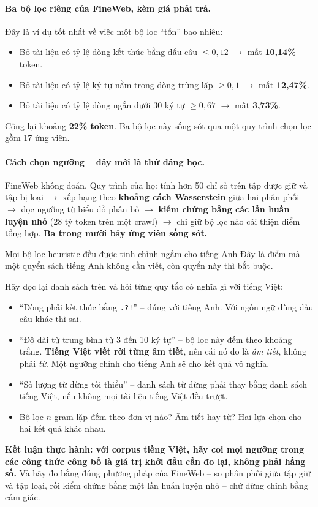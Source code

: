 \paragraph{Ba bộ lọc riêng của FineWeb, kèm giá phải trả.} Đây là ví dụ tốt nhất về việc một bộ lọc “tốn” bao nhiêu:
\begin{itemize}
	\item Bỏ tài liệu có tỷ lệ dòng kết thúc bằng dấu câu $\le 0{,}12$ $\rightarrow$ mất \textbf{10{,}14\%} token.
	\item Bỏ tài liệu có tỷ lệ ký tự nằm trong dòng trùng lặp $\ge 0{,}1$ $\rightarrow$ mất \textbf{12{,}47\%}.
	\item Bỏ tài liệu có tỷ lệ dòng ngắn dưới 30 ký tự $\ge 0{,}67$ $\rightarrow$ mất \textbf{3{,}73\%}.
\end{itemize}
Cộng lại khoảng \textbf{22\% token}. Ba bộ lọc này sống sót qua một quy trình chọn lọc gồm 17 ứng viên.

\paragraph{Cách chọn ngưỡng -- đây mới là thứ đáng học.} FineWeb không đoán. Quy trình của họ: tính hơn 50 chỉ số trên tập được giữ và tập bị loại $\rightarrow$ xếp hạng theo \textbf{khoảng cách Wasserstein} giữa hai phân phối $\rightarrow$ đọc ngưỡng từ biểu đồ phân bố $\rightarrow$ \textbf{kiểm chứng bằng các lần huấn luyện nhỏ} (28 tỷ token trên một crawl) $\rightarrow$ chỉ giữ bộ lọc nào cải thiện điểm tổng hợp. \textbf{Ba trong mười bảy ứng viên sống sót.}

\begin{pitfall}{Mọi bộ lọc heuristic đều được tinh chỉnh ngầm cho tiếng Anh}
Đây là điểm mà một quyển sách tiếng Anh không cần viết, còn quyển này thì bắt buộc.

Hãy đọc lại danh sách trên và hỏi từng quy tắc có nghĩa gì với tiếng Việt:
\begin{itemize}
	\item “Dòng phải kết thúc bằng \texttt{.?!}” -- đúng với tiếng Anh. Với ngôn ngữ dùng dấu câu khác thì sai.
	\item “Độ dài từ trung bình từ 3 đến 10 ký tự” -- bộ lọc này đếm theo khoảng trắng. \textbf{Tiếng Việt viết rời từng âm tiết}, nên cái nó đo là \emph{âm tiết}, không phải \emph{từ}. Một ngưỡng chỉnh cho tiếng Anh sẽ cho kết quả vô nghĩa.
	\item “Số lượng từ dừng tối thiểu” -- danh sách từ dừng phải thay bằng danh sách tiếng Việt, nếu không mọi tài liệu tiếng Việt đều trượt.
	\item Bộ lọc $n$-gram lặp đếm theo đơn vị nào? Âm tiết hay từ? Hai lựa chọn cho hai kết quả khác nhau.
\end{itemize}
\textbf{Kết luận thực hành: với corpus tiếng Việt, hãy coi mọi ngưỡng trong các công thức công bố là giá trị khởi đầu cần đo lại, không phải hằng số.} Và hãy đo bằng đúng phương pháp của FineWeb -- so phân phối giữa tập giữ và tập loại, rồi kiểm chứng bằng một lần huấn luyện nhỏ -- chứ đừng chỉnh bằng cảm giác.
\end{pitfall}

